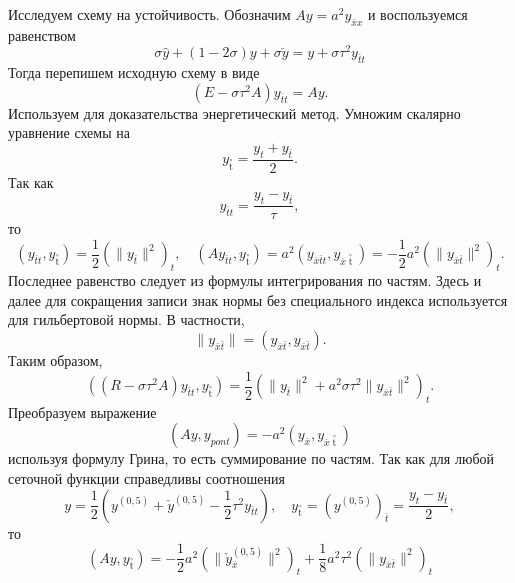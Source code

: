 \documentclass[12pt, a4paper]{article}
\newcommand{\widecheck}[1]{\check{#1}}
\newcommand{\down}[1]{\widecheck{#1}}
\newcommand{\pon}[1]{\mathop {#1}\limits^ \circ}
\begin{document}
	Исследуем схему на устойчивость. Обозначим $Ay = a^2 y_{\bar{x}x}$ и воспользуемся равенством
	\begin{equation*}
		\sigma \hat{y} + (1 - 2 \sigma) y + \sigma \widecheck{y} = y + \sigma \tau^2 y_{\bar{t}t}
	\end{equation*}
	Тогда перепишем исходную схему в виде
	\begin{equation*}
		(E - \sigma \tau^2 A)y_{\bar{t}t} = Ay.
	\end{equation*}
	Используем для доказательства энергетический метод. Умножим скалярно уравнение схемы на 
	\begin{equation*}
		y_{\pon{t}} = \frac{y_t + y_{\bar{t}}}{2}. 
	\end{equation*}
	Так как 
	\begin{equation*}
		y_{\bar{t}t} = \frac{y_t - y_{\bar{t}}}{\tau},
	\end{equation*}
	то 
	\begin{equation*}
		(y_{\bar{t}t}, y_{\pon{t}}) = \frac{1}{2} (\parallel y_{\bar{t}} \parallel^2)_t, \quad (A y_{\bar{t}t}, y_{\pon{t}}) = a^2 (y_{\bar{x} \bar{t} t}, y_{\bar{x} \pon{t}}) = - \frac{1}{2} a^2 (\parallel y_{\bar{x} \bar{t}} \parallel^2)_t.
	\end{equation*}
	Последнее равенство следует из формулы интегрирования по частям. Здесь и далее для сокращения записи знак нормы без специального индекса используется для гильбертовой нормы. В частности,
	\begin{equation*}
		\parallel y_{\bar{x} \bar{t}} \parallel = ( y_{\bar{x} \bar{t}},  y_{\bar{x} \bar{t}}).
	\end{equation*}
	 Таким образом, 
	 \begin{equation*}
	 	((R - \sigma \tau^2 A) y_{\bar{t}t}, y_{\pon{t}}) = \frac{1}{2} (\parallel y_{\bar{t}} \parallel^2 + a^2 \sigma \tau^2 \parallel y_{\bar{x}\bar{t}} \parallel^2)_t.
	\end{equation*}
	Преобразуем выражение 
	\begin{equation*}
		(Ay, y_{pon{t}}) = -a^2 (y_{\bar{x}}, y_{\bar{x} \pon{t}})
	\end{equation*}
	используя формулу Грина, то есть суммирование по частям. Так как для любой сеточной функции справедливы соотношения
	\begin{equation*}
		y = \frac{1}{2} (y^{(0, 5)} +  \down{y}^{(0, 5)} - \frac{1}{2} \tau^2 y_{\bar{t}t}), \quad y_{\pon{t}} = (y^{(0, 5)})_{\bar{t}} = \frac{y_t - y_{\bar{t}}}{2},
	\end{equation*}
	то
	\begin{equation*}
		(Ay, y_{\pon{t}}) = -\frac{1}{2} a^2 (\parallel \down{y}^{(0,5)}_{\bar{x}}\parallel^2)_t + \frac{1}{8} a^2 \tau^2 (\parallel y_{\bar{x}\bar{t}}\parallel^2)_t
	\end{equation*}
\end{document}
